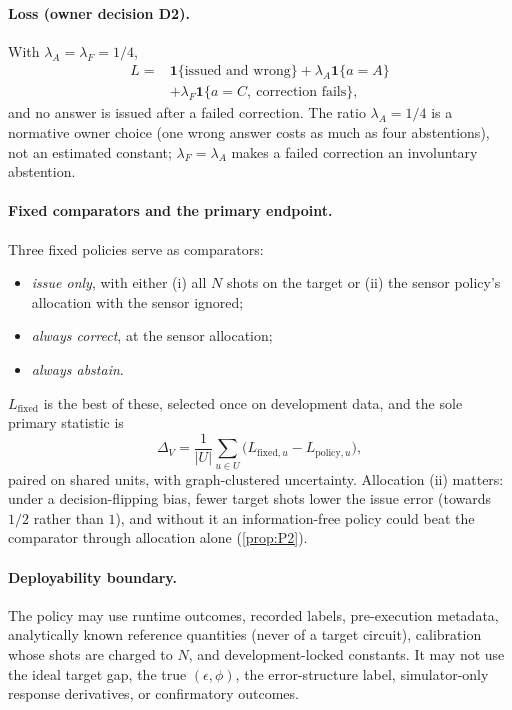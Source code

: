 \documentclass[10pt,twocolumn]{article}
\theoremstyle{definition}
\theoremstyle{remark}
\newcommand{\eps}{\epsilon}
\newcommand{\lA}{\lambda_A}
\newcommand{\lF}{\lambda_F}
\newcommand{\one}{\mathbf 1}
\newcommand{\DV}{\Delta_V}
\begin{document}
\paragraph{Loss (owner decision D2).} With $\lA=\lF=1/4$,
\begin{equation}\label{eq:loss}
\begin{aligned}L={}&\one\{\text{issued and wrong}\}+\lA\one\{a=A\}\\&+\lF\one\{a=C,\ \text{correction fails}\},\end{aligned}
\end{equation}
and no answer is issued after a failed correction. The ratio $\lA=1/4$ is a normative owner choice (one wrong answer costs as much as four abstentions), not an estimated constant; $\lF=\lA$ makes a failed correction an involuntary abstention.

\paragraph{Fixed comparators and the primary endpoint.} Three fixed policies serve as comparators:
\begin{itemize}
\item \emph{issue only}, with either (i) all $N$ shots on the target or (ii) the sensor policy's allocation with the sensor ignored;
\item \emph{always correct}, at the sensor allocation;
\item \emph{always abstain}.
\end{itemize}
$L_{\mathrm{fixed}}$ is the best of these, selected once on development data, and the sole primary statistic is
\begin{equation}\label{eq:DV}
\DV=\frac1{|U|}\sum_{u\in U}\bigl(L_{\mathrm{fixed},u}-L_{\mathrm{policy},u}\bigr),
\end{equation}
paired on shared units, with graph-clustered uncertainty. Allocation (ii) matters: under a decision-flipping bias, fewer target shots lower the issue error (towards $1/2$ rather than $1$), and without it an information-free policy could beat the comparator through allocation alone (\cref{prop:P2}).

\paragraph{Deployability boundary.} The policy may use runtime outcomes, recorded labels, pre-execution metadata, analytically known reference quantities (never of a target circuit), calibration whose shots are charged to $N$, and development-locked constants. It may not use the ideal target gap, the true $(\eps,\phi)$, the error-structure label, simulator-only response derivatives, or confirmatory outcomes.
\end{document}
